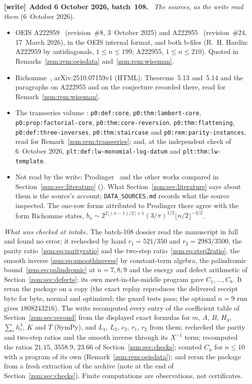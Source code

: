 \documentclass[11pt]{article}
\theoremstyle{definition}\newtheorem{definition}[theorem]{Definition}
\theoremstyle{remark}\newtheorem{remark}[theorem]{Remark}
\newcommand{\file}[1]{\nolinkurl{#1}}
\newenvironment{writenote}[1][]{\par\smallskip\begingroup\small
 \noindent\textbf{[write]}\if\relax\detokenize{#1}\relax\else~\textbf{#1.}\fi\ }%
 {\par\endgroup\smallskip}
\begin{document}
\begin{writenote}[Added 6 October 2026, batch~108]
\emph{The sources, as the write read them} (6~October 2026).
\begin{itemize}\raggedright
\item OEIS A222959~\cite{oeis959} (revision~\#8, 3~October 2025) and
 A222955~\cite{oeis955} (revision~\#24, 17~March 2026), in the OEIS internal
 format, and both b-files (R.~H. Hardin: A222959 by antidiagonals,
 $1\le n\le199$; A222955, $1\le n\le210$). Quoted in
 Remarks~\ref{zsm:rem:oeisdata} and~\ref{zsm:rem:wiseman}.
\item Richomme~\cite{richomme}, arXiv:2510.07159v1 (HTML): Theorems~5.13
 and~5.14 and the paragraphs on A222955 and on the conjecture recorded
 there, read for Remark~\ref{zsm:rem:wiseman}.
\item The transseries volume
 :
 \file{p0:def:core}, \file{p0:thm:lambert-core},
 \file{p0:prop:factorial-core}, \file{p0:thm:core-reversion},
 \file{p0:thm:flattening}, \file{p0:def:three-inverses},
 \file{p0:thm:staircase} and \file{p0:rem:parity-instances}, read for
 Remark~\ref{zsm:rem:transseries}; and, at the independent check of
 6~October 2026, \file{plt:def:lw-monomial-log-datum} and
 \file{plt:thm:lw-template}.
\item Not read by the write: Prodinger~\cite{prodinger} and the other works
 compared in Section~\ref{zsm:sec:literature}
 (\cite{bera,arratia,bhgaussian,bhedgeworth,klp,harrison,aw}). What
 Section~\ref{zsm:sec:literature} says about them is the source's account;
 \file{DATA_SOURCES.md} records what the source inspected. The one-row
 forms attributed to Prodinger there agree with the form Richomme states,
 $b_n\sim2^{2\lfloor(n-1)/2\rfloor+1}(3/\pi)^{1/2}\lfloor n/2\rfloor^{-3/2}$.
\end{itemize}

\emph{What was checked at intake.} The batch-108 dossier read the manuscript
in full and found no error; it rechecked by hand $r_1=521/350$ and
$r_2=2983/3500$, the parity ratio~\eqref{zsm:eq:parityratio} and the
two-step ratio~\eqref{zsm:eq:step2ratio}, the smooth inverse
\eqref{zsm:eq:smoothinverse} by constant-term algebra, the palindromic
bound~\eqref{zsm:eq:palindromic} at $n=7,8,9$ and the energy and defect
arithmetic of Section~\ref{zsm:sec:defects}; its own meet-in-the-middle
program gave $C_1,\dots,C_8$. It reran the package on a copy (the exact
replay reproduces the delivered receipt byte for byte, normal and optimized;
the guard tests pass; the optional $n=9$ run gives $1808243216$). The write
recomputed every entry of the coefficient table of
Section~\ref{zsm:sec:second} from the displayed exact formulas for $m$, $A$,
$B$, $H_3$, $\sum_eh_e^4$, $K$ and $T$ (SymPy), and $L_1$, $L_2$, $c_2$,
$r_1$, $r_2$ from them; rechecked the parity and two-step ratios and the
smooth inverse through its $X^{-1}$ term; recomputed the ratios
$21.15$, $3558.9$, $23.66$ of Section~\ref{zsm:sec:checks}; counted
$C_n$ for $n\le10$ with a program of its own
(Remark~\ref{zsm:rem:oeisdata}); and reran the package from a fresh
extraction of the archive (note at the end of Section~\ref{zsm:sec:checks}).
Finite computations are observations, not certificates.


\end{writenote}
\end{document}
